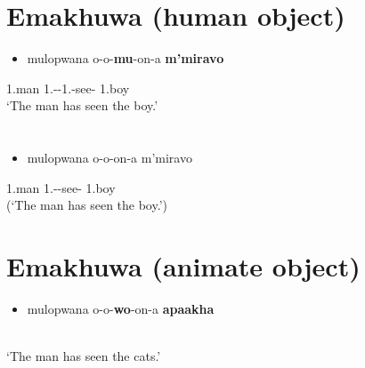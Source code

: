 \documentclass[output=paper]{langsci/langscibook}
\begin{document}
\chapter[Emakhuwa (human object)]{Emakhuwa (human object)}
\setcounter{itemize}{0}
\begin{itemize}
\item \gll mulopwana            o-o-\textbf{mu}{}-on-a                    \textbf{m’miravo}\\
\end{itemize}
     1.man                    1.\textsc{{}-}\textsc{{}-1.}-see-     1.boy\\
\glt ‘The man has seen the boy.’
\z

\chapter[]{\rmfamily }
\begin{itemize}
\item \gll *mulopwana          o-o-on-a                          m’miravo\\
\end{itemize}
     1.man                    1.\textsc{{}-}-see-              1.boy\\
\glt (‘The man has seen the boy.’)
\z

\chapter[]{\rmfamily }
\chapter[Emakhuwa (animate object)]{Emakhuwa (animate object)}
\setcounter{itemize}{0}
\begin{itemize}
\item \gll mulopwana           o-o-\textbf{wo}{}-on-a                    \textbf{apaakha}\\
\end{itemize}
     \\
\glt  ‘The man has seen the cats.’
\z
\end{document}
